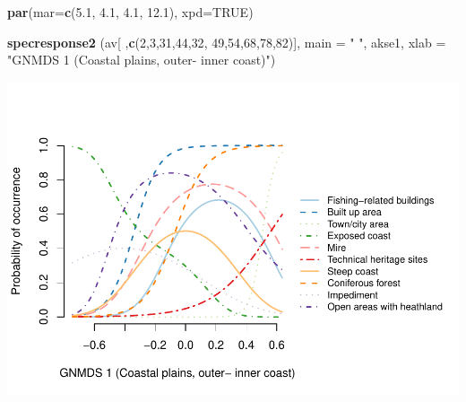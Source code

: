 \documentclass[]{article}
\newenvironment{Shaded}{\begin{snugshade}}{\end{snugshade}}
\newcommand{\CommentTok}[1]{\textcolor[rgb]{0.56,0.35,0.01}{\textit{#1}}}
\newcommand{\DataTypeTok}[1]{\textcolor[rgb]{0.13,0.29,0.53}{#1}}
\newcommand{\DecValTok}[1]{\textcolor[rgb]{0.00,0.00,0.81}{#1}}
\newcommand{\FloatTok}[1]{\textcolor[rgb]{0.00,0.00,0.81}{#1}}
\newcommand{\KeywordTok}[1]{\textcolor[rgb]{0.13,0.29,0.53}{\textbf{#1}}}
\newcommand{\NormalTok}[1]{#1}
\newcommand{\OtherTok}[1]{\textcolor[rgb]{0.56,0.35,0.01}{#1}}
\newcommand{\StringTok}[1]{\textcolor[rgb]{0.31,0.60,0.02}{#1}}
\begin{document}
\begin{Shaded}
\begin{Highlighting}[]
\KeywordTok{par}\NormalTok{(}\DataTypeTok{mar=}\KeywordTok{c}\NormalTok{(}\FloatTok{5.1}\NormalTok{, }\FloatTok{4.1}\NormalTok{, }\FloatTok{4.1}\NormalTok{, }\FloatTok{12.1}\NormalTok{), }\DataTypeTok{xpd=}\OtherTok{TRUE}\NormalTok{)}

\KeywordTok{specresponse2}\NormalTok{ (av[ ,}\KeywordTok{c}\NormalTok{(}\DecValTok{2}\NormalTok{,}\DecValTok{3}\NormalTok{,}\DecValTok{31}\NormalTok{,}\DecValTok{44}\NormalTok{,}\DecValTok{32}\NormalTok{, }\DecValTok{49}\NormalTok{,}\DecValTok{54}\NormalTok{,}\DecValTok{68}\NormalTok{,}\DecValTok{78}\NormalTok{,}\DecValTok{82}\NormalTok{)], }\DataTypeTok{main =} \StringTok{" "}\NormalTok{, akse1, }\DataTypeTok{xlab =} \StringTok{"GNMDS 1 (Coastal plains, outer- inner coast)"}\NormalTok{)}
\end{Highlighting}
\end{Shaded}

\includegraphics{Landscape_analysis_example_4_files/figure-latex/unnamed-chunk-55-1.pdf}

\begin{Shaded}
\end{Shaded}
\end{document}
